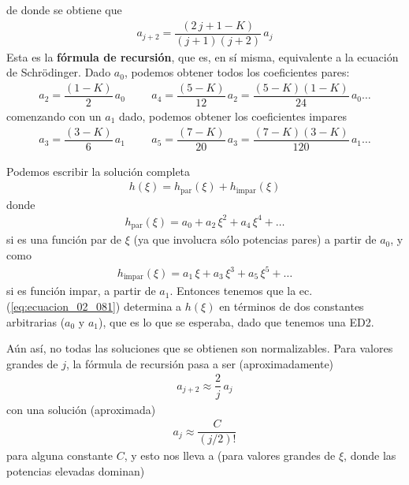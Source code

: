 de donde se obtiene que
\begin{align}
a_{j+2} = \dfrac{(2 \, j + 1 - K)}{(j + 1)(j + 2)} \, a_{j}
\label{eq:ecuacion_02_081}
\end{align}
Esta es la \textbf{fórmula de recursión}, que es, en sí misma, equivalente a la ecuación de Schrödinger. Dado $a_{0}$, podemos obtener todos los coeficientes pares:
\begin{align*}
a_{2} = \dfrac{(1 - K)}{2} \, a_{0} \hspace{1cm} a_{4} = \dfrac{(5 - K)}{12} \, a_{2} = \dfrac{(5 - K)(1 - K)}{24} \, a_{0} \ldots
\end{align*}
comenzando con un $a_{1}$ dado, podemos obtener los coeficientes impares
\begin{align*}
a_{3} = \dfrac{(3 - K)}{6} \, a_{1} \hspace{1cm} a_{5} = \dfrac{(7 - K)}{20} \, a_{3} = \dfrac{(7 - K)(3 - K)}{120} \, a_{1} \ldots
\end{align*}
\par
Podemos escribir la solución completa
\begin{align}
h (\xi) = h_{\text{par}} (\xi) + h_{\text{impar}} (\xi)
\label{eq:ecuacion_02_082}
\end{align}
donde
\begin{align*}
h_{\text{par}} (\xi) = a_{0} + a_{2} \, \xi^{2} + a_{4} \, \xi^{4} + \ldots
\end{align*}
si es una función par de $\xi$ (ya que involucra sólo potencias pares) a partir de $a_{0}$, y como
\begin{align*}
h_{\text{impar}} (\xi) = a_{1} \, \xi + a_{3} \, \xi^{3} + a_{5} \, \xi^{5} + \ldots
\end{align*}
si es función impar, a partir de $a_{1}$. Entonces tenemos que la ec. (\ref{eq:ecuacion_02_081}) determina a $h(\xi)$ en términos de dos constantes arbitrarias ($a_{0}$ y $a_{1}$), que es lo que se esperaba, dado que tenemos una ED2.
\par
Aún así, no todas las soluciones que se obtienen son normalizables. Para valores grandes de $j$, la fórmula de recursión pasa a ser (aproximadamente)
\begin{align*}
a_{j+2} \approx \dfrac{2}{j} \, a_{j}
\end{align*}
con una solución (aproximada)
\begin{align*}
a_{j} \approx \dfrac{C}{(j/2)!}
\end{align*}
para alguna constante $C$, y esto nos lleva a (para valores grandes de $\xi$, donde las potencias elevadas dominan)

